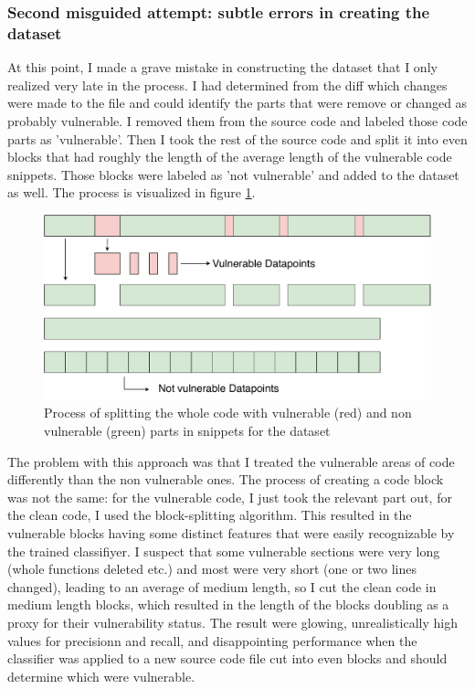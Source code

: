 \documentclass[
	a4paper,
	pagesize,
	pdftex,
	12pt,
	twoside, %
	BCOR=5mm, %
	ngerman,
	fleqn,
	final,
	]{scrartcl}
\begin{document}
\subsubsection{Second misguided attempt: subtle errors in creating the dataset}
At this point, I made a grave mistake in constructing the dataset that I only realized very late in the process. I had determined from the diff which changes were made to the file and could identify the parts that were remove or changed as probably vulnerable. I removed them from the source code and labeled those code parts as 'vulnerable'. Then I took the rest of the source code and split it into even blocks that had roughly the length of the average length of the vulnerable code snippets. Those blocks were labeled as 'not vulnerable' and added to the dataset as well. The process is visualized in figure \ref{fig:collectData1}.

\begin{figure}[ht]
	\centering
	\includegraphics[width=0.8\linewidth]{img/collectData1}
	\caption{Process of splitting the whole code with vulnerable (red) and non vulnerable (green) parts in snippets for the dataset}
	\label{fig:collectData1}
\end{figure}

The problem with this approach was that I treated the vulnerable areas of code differently than the non vulnerable ones. The process of creating a code block was not the same: for the vulnerable code, I just took the relevant part out, for the clean code, I used the block-splitting algorithm. This resulted in the vulnerable blocks having some distinct features that were easily recognizable by the trained classifiyer. I suspect that some vulnerable sections were very long (whole functions deleted etc.) and most were very short (one or two lines changed), leading to an average of medium length, so I cut the clean code in medium length blocks, which resulted in the length of the blocks doubling as a proxy for their vulnerability status. The result were glowing, unrealistically high values for precisionn and recall, and disappointing performance when the classifier was applied to a new source code file cut into even blocks and should determine which were vulnerable.\\
\end{document}
